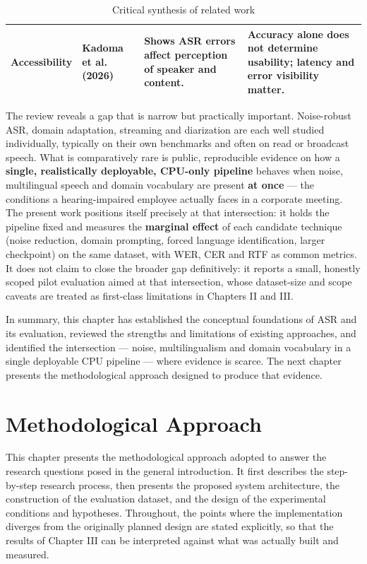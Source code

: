 \documentclass[12pt]{report}
\begin{document}
\begin{table}[htbp]
\begin{tabular}{|p{2.2cm}|p{2.8cm}|p{4.4cm}|p{4.6cm}|}
\multirow{1}{2.2cm}{Accessibility}
& Kadoma et al. (2026) \cite{kadoma2026lost}
& Shows ASR errors affect perception of speaker and content.
& Accuracy alone does not determine usability; latency and error visibility matter. \\ \hline
\end{tabular}
\caption{Critical synthesis of related work}
\label{tab:sota_synthesis}
\end{table}

The review reveals a gap that is narrow but practically important. Noise-robust ASR, domain adaptation, streaming and diarization are each well studied individually, typically on their own benchmarks and often on read or broadcast speech. What is comparatively rare is public, reproducible evidence on how a \textbf{single, realistically deployable, CPU-only pipeline} behaves when noise, multilingual speech and domain vocabulary are present \textbf{at once} --- the conditions a hearing-impaired employee actually faces in a corporate meeting. The present work positions itself precisely at that intersection: it holds the pipeline fixed and measures the \textbf{marginal effect} of each candidate technique (noise reduction, domain prompting, forced language identification, larger checkpoint) on the same dataset, with WER, CER and RTF as common metrics. It does not claim to close the broader gap definitively: it reports a small, honestly scoped pilot evaluation aimed at that intersection, whose dataset-size and scope caveats are treated as first-class limitations in Chapters II and III.

\vspace{0.5em}
In summary, this chapter has established the conceptual foundations of ASR and its evaluation, reviewed the strengths and limitations of existing approaches, and identified the intersection --- noise, multilingualism and domain vocabulary in a single deployable CPU pipeline --- where evidence is scarce. The next chapter presents the methodological approach designed to produce that evidence.

\chapter{Methodological Approach}

This chapter presents the methodological approach adopted to answer the research questions posed in the general introduction. It first describes the step-by-step research process, then presents the proposed system architecture, the construction of the evaluation dataset, and the design of the experimental conditions and hypotheses. Throughout, the points where the implementation diverges from the originally planned design are stated explicitly, so that the results of Chapter III can be interpreted against what was actually built and measured.
\end{document}

